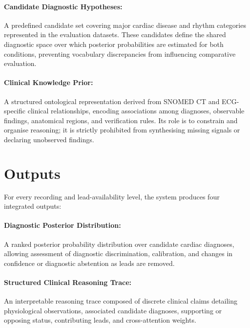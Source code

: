\documentclass{ssnreview}
\begin{document}
\paragraph{Candidate Diagnostic Hypotheses:} A predefined candidate set covering major
cardiac disease and rhythm categories represented in the evaluation datasets. These candidates
define the shared diagnostic space over which posterior probabilities are estimated for both
conditions, preventing vocabulary discrepancies from influencing comparative evaluation.

\paragraph{Clinical Knowledge Prior:} A structured ontological representation derived from
SNOMED CT and ECG-specific clinical relationships, encoding associations among diagnoses,
observable findings, anatomical regions, and verification rules. Its role is to constrain and
organise reasoning; it is strictly prohibited from synthesising missing signals or declaring
unobserved findings.

\section{Outputs}

For every recording and lead-availability level, the system produces four integrated outputs:

\paragraph{Diagnostic Posterior Distribution:} A ranked posterior probability distribution
over candidate cardiac diagnoses, allowing assessment of diagnostic discrimination,
calibration, and changes in confidence or diagnostic abstention as leads are removed.

\paragraph{Structured Clinical Reasoning Trace:} An interpretable reasoning trace composed of
discrete clinical claims detailing physiological observations, associated candidate
diagnoses, supporting or opposing status, contributing leads, and cross-attention weights.
\end{document}
